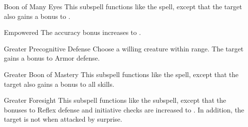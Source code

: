 \begin{ability}[\nth{5}]{Boon of Many Eyes}
This subspell functions like the  spell, except that the target also gains a  bonus to .
\end{ability}
\vspace{0.25em}


\begin{ability}[\nth{5}]{Empowered}
The accuracy bonus increases to .
\end{ability}
\vspace{0.25em}


\begin{ability}[\nth{6}]{Greater Precognitive Defense}
Choose a willing creature within \rngclose range.
The target gains a  bonus to Armor defense.
\end{ability}
\vspace{0.25em}


\begin{ability}[\nth{7}]{Greater Boon of Mastery}
This subspell functions like the  spell, except that the target also gains a  bonus to all skills.
\end{ability}
\vspace{0.25em}


\begin{ability}[\nth{7}]{Greater Foresight}
This subspell functions like the  subspell, except that the bonuses to Reflex defense and initiative checks are increased to .
In addition, the target is not  when attacked by surprise.
\end{ability}
\vspace{0.25em}

